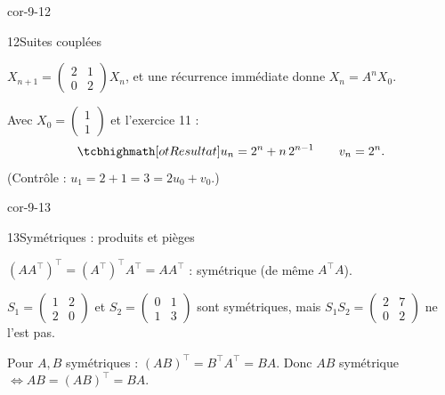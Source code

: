 \begin{blocLivre}{cor-9-12}
\begin{corrige}{12}{Suites couplées}
\begin{questions}
  \item $X_{n+1}=\begin{pmatrix}2&1\\0&2\end{pmatrix}X_n$, et une
    récurrence immédiate donne $X_n=A^{n}X_0$.
  \item Avec $X_0=\begin{pmatrix}1\\1\end{pmatrix}$ et l'exercice 11 :
    \[
      \res{u_n=2^{n}+n\,2^{n-1}\qquad v_n=2^{n}}.
    \]
    (Contrôle : $u_1=2+1=3=2u_0+v_0$.)
\end{questions}
\end{corrige}
\end{blocLivre}

\begin{blocLivre}{cor-9-13}
\begin{corrige}{13}{Symétriques : produits et pièges}
\begin{questions}
  \item $(AA^{\top})^{\top}=(A^{\top})^{\top}A^{\top}=AA^{\top}$ :
    symétrique (de même $A^{\top}A$).
  \item $S_1=\begin{pmatrix}1&2\\2&0\end{pmatrix}$ et
    $S_2=\begin{pmatrix}0&1\\1&3\end{pmatrix}$ sont symétriques, mais
    $S_1S_2=\begin{pmatrix}2&7\\0&2\end{pmatrix}$ ne l'est pas.
  \item Pour $A,B$ symétriques : $(AB)^{\top}=B^{\top}A^{\top}=BA$.
    Donc $AB$ symétrique $\iff AB=(AB)^{\top}=BA$.
\end{questions}
\end{corrige}
\end{blocLivre}

